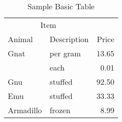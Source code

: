 \begin{table}
    \caption{Sample Basic Table}
    \label{tab:BasicTable}
    \begin{tabular}{@{}llr@{}}         \toprule
    \multicolumn{2}{c}{Item}        \\ \cmidrule(r){1-2}
    Animal    & Description & Price \\ \midrule
    Gnat      & per gram    & 13.65 \\
              & each        &  0.01 \\
    Gnu       & stuffed     & 92.50 \\
    Emu       & stuffed     & 33.33 \\
    Armadillo & frozen      &  8.99 \\ \bottomrule
    \end{tabular}
  \end{table}